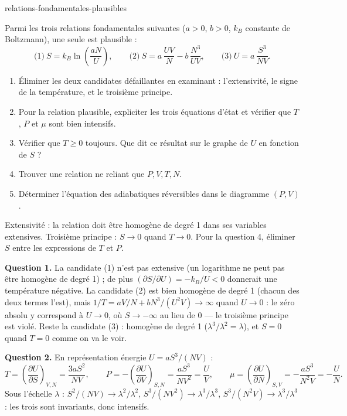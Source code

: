 \begin{exo}{relations-fondamentales-plausibles}

Parmi les trois relations fondamentales suivantes ($a > 0$, $b > 0$, $k_B$ constante de Boltzmann), une seule est plausible :
\[
\text{(1)}\ S = k_B\ln\!\left(\frac{aN}{U}\right), \qquad
\text{(2)}\ S = a\,\frac{UV}{N} - b\,\frac{N^3}{UV}, \qquad
\text{(3)}\ U = a\,\frac{S^3}{NV}.
\]

\begin{enumerate}
\item Éliminer les deux candidates défaillantes en examinant : l'extensivité, le signe de la température, et le troisième principe.
\item Pour la relation plausible, expliciter les trois équations d'état et vérifier que $T$, $P$ et $\mu$ sont bien intensifs.
\item Vérifier que $T \geq 0$ toujours. Que dit ce résultat sur le graphe de $U$ en fonction de $S$ ?
\item Trouver une relation ne reliant que $P, V, T, N$.
\item Déterminer l'équation des adiabatiques réversibles dans le diagramme $(P,V)$.
\end{enumerate}

\begin{indication}
Extensivité : la relation doit être homogène de degré 1 dans ses variables extensives. Troisième principe : $S \to 0$ quand $T \to 0$. Pour la question 4, éliminer $S$ entre les expressions de $T$ et $P$.
\end{indication}

\begin{solution}
\textbf{Question 1.} La candidate (1) n'est pas extensive (un logarithme ne peut pas être homogène de degré 1) ; de plus $\left(\partial S/\partial U\right) = -k_B/U < 0$ donnerait une température négative. La candidate (2) est bien homogène de degré 1 (chacun des deux termes l'est), mais $1/T = aV/N + bN^3/(U^2V) \to \infty$ quand $U \to 0$ : le zéro absolu y correspond à $U \to 0$, où $S \to -\infty$ au lieu de $0$ — le troisième principe est violé. Reste la candidate (3) : homogène de degré 1 ($\lambda^3/\lambda^2 = \lambda$), et $S = 0$ quand $T = 0$ comme on va le voir.

\textbf{Question 2.} En représentation énergie $U = aS^3/(NV)$ :
\[
T = \left(\frac{\partial U}{\partial S}\right)_{V,N} = \frac{3aS^2}{NV}, \qquad
P = -\left(\frac{\partial U}{\partial V}\right)_{S,N} = \frac{aS^3}{NV^2} = \frac{U}{V}, \qquad
\mu = \left(\frac{\partial U}{\partial N}\right)_{S,V} = -\frac{aS^3}{N^2V} = -\frac{U}{N}.
\]
Sous l'échelle $\lambda$ : $S^2/(NV) \to \lambda^2/\lambda^2$, $S^3/(NV^2) \to \lambda^3/\lambda^3$, $S^3/(N^2V) \to \lambda^3/\lambda^3$ : les trois sont invariants, donc intensifs. \checkmark


\end{solution}
\end{exo}
